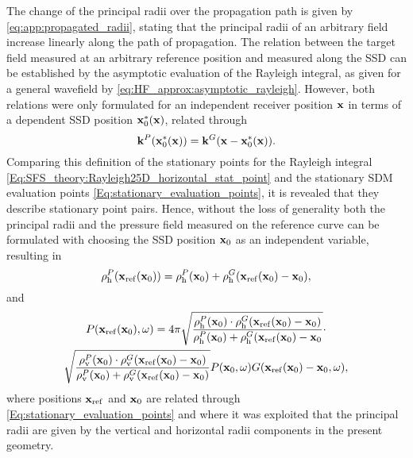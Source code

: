The change of the principal radii over the propagation path is given by \eqref{eq:app:propagated_radii}, stating that the principal radii of an arbitrary field increase linearly along the path of propagation.
The relation between the target field measured at an arbitrary reference position and measured along the SSD can be established by the asymptotic evaluation of the Rayleigh integral, as given for a general wavefield by \eqref{eq:HF_approx:asymptotic_rayleigh}.
However, both relations were only formulated for an independent receiver position $\mathbf{x}$ in terms of a dependent SSD position $\mathbf{x}_0^*(\mathbf{x})$, related through
\begin{equation}
\label{Eq:SFS_theory:Rayleigh25D_horizontal_stat_point}
\mathbf{k}^P(\mathbf{x}_0^*(\mathbf{x})) = \mathbf{k}^G( \mathbf{x} - \mathbf{x}_0^*(\mathbf{x})).
\end{equation}
Comparing this definition of the stationary points for the Rayleigh integral \eqref{Eq:SFS_theory:Rayleigh25D_horizontal_stat_point} and the stationary SDM evaluation points \eqref{Eq:stationary_evaluation_points}, it is revealed that they describe stationary point pairs.
Hence, without the loss of generality both the principal radii and the pressure field measured on the reference curve can be formulated with choosing the SSD position $\mathbf{x}_0$ as an independent variable, resulting in
\begin{equation}
\label{Eq:principal_radii_addition}
\rho_\mathrm{h}^P(\mathbf{x}_{\mathrm{ref}}(\mathbf{x}_0)) = \rho_\mathrm{h}^P(\mathbf{x}_0) + \rho_\mathrm{h}^G(\mathbf{x}_{\mathrm{ref}}(\mathbf{x}_0)-\mathbf{x}_0),
\end{equation}
and
\small
\begin{multline}
\label{Eq:Asymptotic_Rayleigh_integral}
P(\mathbf{x}_{\mathrm{ref}}(\mathbf{x}_0),\omega) = 
4\pi
\sqrt{\frac{\rho_\mathrm{h}^P(\mathbf{x}_0) \cdot \rho_\mathrm{h}^G(\mathbf{x}_{\mathrm{ref}}(\mathbf{x}_0)-\mathbf{x}_0)}{\rho_\mathrm{h}^P(\mathbf{x}_0) + \rho_\mathrm{h}^G(\mathbf{x}_{\mathrm{ref}}(\mathbf{x}_0)-\mathbf{x}_0}} \cdot \\ 
\sqrt{\frac{\rho_\mathrm{v}^P(\mathbf{x}_0) \cdot \rho_\mathrm{v}^G(\mathbf{x}_{\mathrm{ref}}(\mathbf{x}_0)-\mathbf{x}_0)}{\rho_\mathrm{v}^P(\mathbf{x}_0) + \rho_\mathrm{v}^G(\mathbf{x}_{\mathrm{ref}}(\mathbf{x}_0)-\mathbf{x}_0)}}
P(\mathbf{x}_0,\omega) G(\mathbf{x}_{\mathrm{ref}}(\mathbf{x}_0)-\mathbf{x}_0,\omega)
,
\end{multline} %
\normalsize
where positions $\mathbf{x}_{\mathrm{ref}}$ and $\mathbf{x}_0$ are related through \eqref{Eq:stationary_evaluation_points} and where it was exploited that the principal radii are given by the vertical and horizontal radii components in the present geometry.

